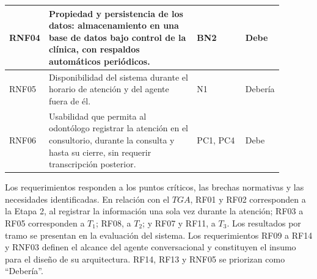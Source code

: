 \begin{longtable}{|>{\centering\arraybackslash}p{0.06\linewidth}|p{0.55\linewidth}|p{0.18\linewidth}|>{\centering\arraybackslash}p{0.10\linewidth}|}
RNF04 & Propiedad y persistencia de los datos: almacenamiento en una base de datos bajo control de la clínica, con respaldos automáticos periódicos. & BN2 & Debe \\ \hline

RNF05 & Disponibilidad del sistema durante el horario de atención y del agente fuera de él. & N1 & Debería \\ \hline

RNF06 & Usabilidad que permita al odontólogo registrar la atención en el consultorio, durante la consulta y hasta su cierre, sin requerir transcripción posterior. & PC1, PC4 & Debe \\ \hline

\end{longtable}
\endgroup

Los requerimientos responden a los puntos críticos, las brechas normativas y las necesidades identificadas. En relación con el $TGA$, RF01 y RF02 corresponden a la Etapa 2, al registrar la información una sola vez durante la atención; RF03 a RF05 corresponden a $T_1$; RF08, a $T_2$; y RF07 y RF11, a $T_3$. Los resultados por tramo se presentan en la evaluación del sistema. Los requerimientos RF09 a RF14 y RNF03 definen el alcance del agente conversacional y constituyen el insumo para el diseño de su arquitectura. RF14, RF13 y RNF05 se priorizan como ``Debería''.
